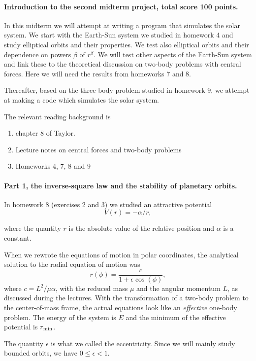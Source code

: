 \documentclass[%
oneside,                 %
final,                   %
10pt]{article}
\begin{document}
\noindent
\paragraph{Introduction to the second midterm project, total score 100 points.}
In this midterm we will attempt at writing a program that simulates
the solar system. We start with the Earth-Sun system we studied in
homework 4 and study elliptical orbits and their properties. We test
also elliptical orbits and their dependence on powers $\beta$ of
$r^{\beta}$. We will test other aspects of the Earth-Sun system and
link these to the theoretical discussion on two-body problems with
central forces. Here we will need the results from homeworks 7 and 8.

Thereafter, based on the three-body problem studied in homework 9, we
attempt at making a code which simulates the solar system.

The relevant reading background is
\begin{enumerate}
\item chapter 8 of  Taylor.

\item Lecture notes on central forces and two-body problems

\item Homeworks 4, 7, 8 and 9
\end{enumerate}

\noindent
\paragraph{Part 1, the inverse-square law and the stability of planetary orbits.}
In homework 8 (exercises 2 and 3) we studied an attractive potential
\[
V(r)=-\alpha/r,
\]

where the quantity $r$ is the absolute value of the relative position and $\alpha$ is a constant.

When we rewrote the equations of motion in polar coordinates, the analytical solution to the radial equation of motion was
\[
r(\phi) = \frac{c}{1+\epsilon\cos{(\phi)}},
\]
where $c=L^2/\mu\alpha$, with
the reduced mass $\mu$ and the angular momentum $L$, as
discussed during the lectures. With the transformation of a two-body
problem to the center-of-mass frame, the actual equations look like an
\emph{effective} one-body problem. The energy of the system is $E$ and the
minimum of the effective potential is $r_{\rm min}$.

The quantity $\epsilon$ is what we called the eccentricity. Since we will mainly study bounded orbits,
we have $0 \le \epsilon < 1$.
\end{document}
